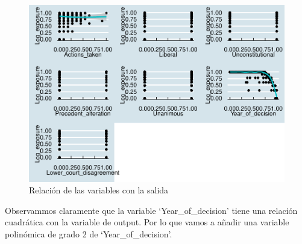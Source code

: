 \documentclass[
]{article}
\begin{document}
\begin{figure}

{\centering \includegraphics[width=0.8\linewidth]{anacalt-regresion_files/figure-latex/scat_smooth-1} 

}

\caption{Relación de las variables con la salida}\label{fig:scat_smooth}
\end{figure}

Observammos claramente que la variable `Year\_of\_decision' tiene una
relación cuadrática con la variable de output. Por lo que vamos a añadir
una variable polinómica de grado 2 de `Year\_of\_decision'.
\end{document}
